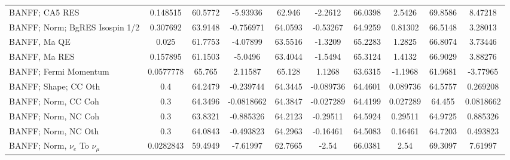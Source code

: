 \begin{tabular}{| l | S | S  S | S  S | S  S | S  S | }
                                                                  BANFF; CA5 RES &        0.148515 &         60.5772 &        -5.93936 &          62.946 &         -2.2612 &         66.0398 &          2.5426 &         69.8586 &         8.47218 \\ 
                                                  BANFF; Norm; BgRES Isospin 1/2 &        0.307692 &         63.9148 &       -0.756971 &         64.0593 &        -0.53267 &         64.9259 &         0.81302 &         66.5148 &         3.28013 \\ 
                                                                    BANFF, Ma QE &           0.025 &         61.7753 &        -4.07899 &         63.5516 &         -1.3209 &         65.2283 &          1.2825 &         66.8074 &         3.73446 \\ 
                                                                   BANFF, Ma RES &        0.157895 &         61.1503 &         -5.0496 &         63.4044 &         -1.5494 &         65.3124 &          1.4132 &         66.9029 &         3.88276 \\ 
                                                           BANFF; Fermi Momentum &       0.0577778 &          65.765 &         2.11587 &          65.128 &          1.1268 &         63.6315 &         -1.1968 &         61.9681 &        -3.77965 \\ 
                                                            BANFF; Shape; CC Oth &             0.4 &         64.2479 &       -0.239744 &         64.3445 &       -0.089736 &         64.4601 &        0.089736 &         64.5757 &        0.269208 \\ 
                                                             BANFF; Norm, CC Coh &             0.3 &         64.3496 &      -0.0818662 &         64.3847 &       -0.027289 &         64.4199 &        0.027289 &          64.455 &       0.0818662 \\ 
                                                             BANFF; Norm, NC Coh &             0.3 &         63.8321 &       -0.885326 &         64.2123 &        -0.29511 &         64.5924 &         0.29511 &         64.9725 &        0.885326 \\ 
                                                             BANFF; Norm, NC Oth &             0.3 &         64.0843 &       -0.493823 &         64.2963 &        -0.16461 &         64.5083 &         0.16461 &         64.7203 &        0.493823 \\ 
                                           BANFF; Norm, $\nu_{e}$ To $\nu_{\mu}$ &       0.0282843 &         59.4949 &        -7.61997 &         62.7665 &           -2.54 &         66.0381 &            2.54 &         69.3097 &         7.61997 \\ 

\end{tabular}
